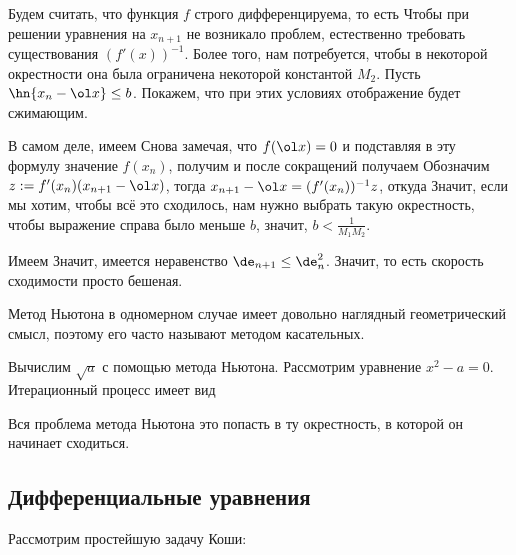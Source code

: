 \documentclass[a4paper]{article}
\begin{document}
Будем считать, что функция $f$ строго дифференцируема, то есть
  Чтобы при
решении уравнения на $x_{n+1}$ не возникало проблем, естественно
требовать существования $(f'(x))^{-1}$. Более того, нам потребуется,
чтобы в некоторой окрестности она была ограничена некоторой константой
$M_2$. Пусть $\hn{x_n - \ol x} \le b$.  Покажем, что при этих условиях
отображение будет сжимающим.

В самом деле, имеем   Снова замечая, что $f(\ol x) = 0$ и
подставляя в эту формулу значение $f(x_n)$, получим
 и после сокращений получаем  Обозначим $z := f'(x_n) (x_{n+1} -
\ol x)$, тогда $x_{n+1} - \ol x = (f'(x_n))^{-1}z$, откуда
  Значит, если мы хотим, чтобы всё это сходилось,
нам нужно выбрать такую окрестность, чтобы выражение справа было
меньше $b$, значит, $b < \frac{1}{M_1 M_2}$.

Имеем   Значит, имеется неравенство $\de_{n+1} \le
\de_n^2$. Значит,  то есть скорость
сходимости просто бешеная.

\begin{note}
Метод Ньютона в одномерном случае имеет довольно наглядный
геометрический смысл, поэтому его часто называют методом касательных.
\end{note}

\begin{ex}
Вычислим $\sqrt{a}$ с помощью метода Ньютона.  Рассмотрим уравнение
$x^2 - a = 0$. Итерационный процесс имеет вид 
\end{ex}

Вся проблема метода Ньютона это попасть в ту окрестность, в которой он
начинает сходиться.

\subsection{Дифференциальные уравнения}

Рассмотрим простейшую задачу Коши: 
\end{document}

